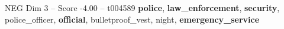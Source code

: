 \begin{textsample}{NEG Dim 3 – Score -4.00 – t004589}  \label{ex:f3_neg_038}
\textbf{police}, \textbf{law\_enforcement}, \textbf{security}, police\_officer, \textbf{official}, bulletproof\_vest, night, \textbf{emergency\_service}

\end{textsample}
